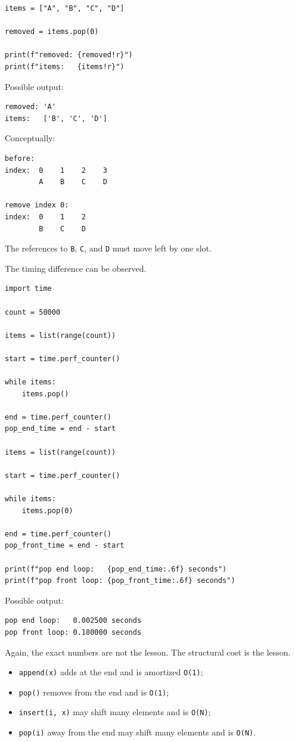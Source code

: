 \begin{verbatim}
items = ["A", "B", "C", "D"]

removed = items.pop(0)

print(f"removed: {removed!r}")
print(f"items:   {items!r}")
\end{verbatim}

Possible output:

\begin{verbatim}
removed: 'A'
items:   ['B', 'C', 'D']
\end{verbatim}

Conceptually:

\begin{verbatim}
before:
index:  0    1    2    3
        A    B    C    D

remove index 0:
index:  0    1    2
        B    C    D
\end{verbatim}

The references to \texttt{B}, \texttt{C}, and \texttt{D} must move left by one slot.

The timing difference can be observed.

\begin{verbatim}
import time

count = 50000

items = list(range(count))

start = time.perf_counter()

while items:
    items.pop()

end = time.perf_counter()
pop_end_time = end - start

items = list(range(count))

start = time.perf_counter()

while items:
    items.pop(0)

end = time.perf_counter()
pop_front_time = end - start

print(f"pop end loop:   {pop_end_time:.6f} seconds")
print(f"pop front loop: {pop_front_time:.6f} seconds")
\end{verbatim}

Possible output:

\begin{verbatim}
pop end loop:   0.002500 seconds
pop front loop: 0.180000 seconds
\end{verbatim}

Again, the exact numbers are not the lesson. The structural cost is the lesson.

\begin{itemize}
    \item \texttt{append(x)} adds at the end and is amortized \texttt{O(1)};
    \item \texttt{pop()} removes from the end and is \texttt{O(1)};
    \item \texttt{insert(i, x)} may shift many elements and is \texttt{O(N)};
    \item \texttt{pop(i)} away from the end may shift many elements and is \texttt{O(N)}.
\end{itemize}

